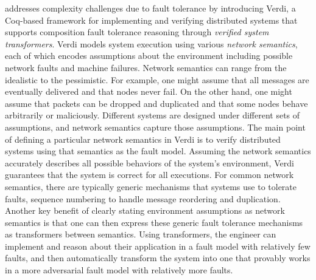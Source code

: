  addresses complexity challenges due to fault tolerance
  by introducing Verdi,
  a Coq-based framework for implementing and verifying distributed systems
  that supports composition fault tolerance reasoning
  through \emph{verified system transformers}.
Verdi models system execution using various \emph{network semantics},
  each of which encodes assumptions about the environment
  including possible network faults and machine failures.
Network semantics can range from the idealistic to the pessimistic.
For example, one might assume that
  all messages are eventually delivered and that nodes never fail.
On the other hand, one might assume that
  packets can be dropped and duplicated and that
  some nodes behave arbitrarily or maliciously.
Different systems are designed under different sets of assumptions,
  and network semantics capture those assumptions.
The main point of defining a particular network semantics in Verdi is
  to verify distributed systems using that semantics as the fault model.
Assuming the network semantics accurately describes
  all possible behaviors of the system's environment,
  Verdi guarantees that the system is correct for all executions.
For common network semantics,
  there are typically generic mechanisms that systems use to tolerate faults,
  \eg sequence numbering to handle message reordering and duplication.
Another key benefit of
  clearly stating environment assumptions as network semantics is that
  one can then express these generic fault tolerance mechanisms
  as transformers between semantics.
Using transformers, the engineer can
  implement and reason about their application
  in a fault model with relatively few faults, and
  then automatically transform the system into one
  that provably works in a more adversarial fault model
  with relatively more faults.



